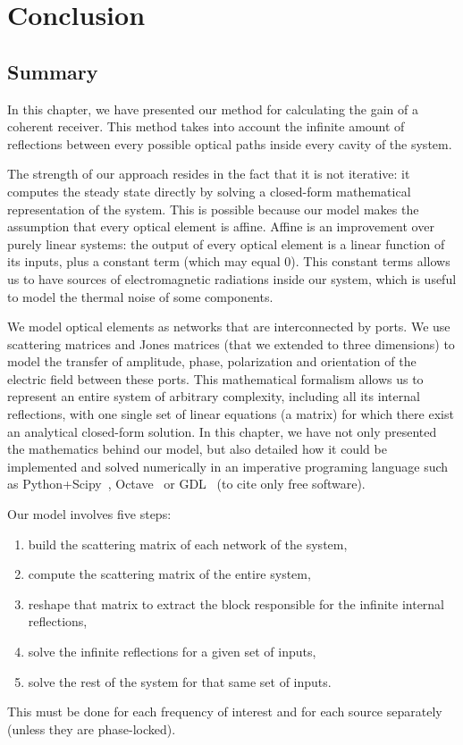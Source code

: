 \FloatBarrier
\section{Conclusion}




\subsection{Summary}
In this chapter, we have presented our method for calculating the gain of a coherent receiver.
This method takes into account the infinite amount of reflections between every possible optical paths inside every cavity of the system.

The strength of our approach resides in the fact that it is not iterative: it computes the steady state directly by solving a closed-form mathematical representation of the system.
This is possible because our model makes the assumption that every optical element is affine.
Affine is an improvement over purely linear systems: the output of every optical element is a linear function of its inputs, plus a constant term (which may equal 0).
This constant terms allows us to have sources of electromagnetic radiations inside our system, which is useful to model the thermal noise of some components.

We model optical elements as networks that are interconnected by ports.
We use scattering matrices and Jones matrices (that we extended to three dimensions) to model the transfer of amplitude, phase, polarization and orientation of the electric field between these ports.
This mathematical formalism allows us to represent an entire system of arbitrary complexity, including all its internal reflections, with one single set of linear equations (a matrix) for which there exist an analytical closed-form solution.
In this chapter, we have not only presented the mathematics behind our model, but also detailed how it could be implemented and solved numerically in an imperative programing language such as Python+Scipy~\cite{python,scipy}, Octave~\cite{octave:2014} or GDL~\cite{gnudatalanguage}
(to cite only free software).

Our model involves five steps:
\begin{enumerate}
    \item build the scattering matrix of each network of the system,
    \item compute the scattering matrix of the entire system,
    \item reshape that matrix to extract the block responsible for the infinite internal reflections,
    \item solve the infinite reflections for a given set of inputs,
    \item solve the rest of the system for that same set of inputs.
\end{enumerate}
This must be done for each frequency of interest and for each source separately (unless they are phase-locked).

